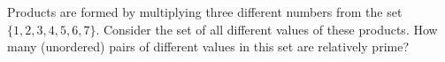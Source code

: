 Products are formed by multiplying three different numbers from the set $\{1,2,3,4,5,6,7\}$. Consider the set of all different values of these products. How many (unordered) pairs of different values in this set are relatively prime?
